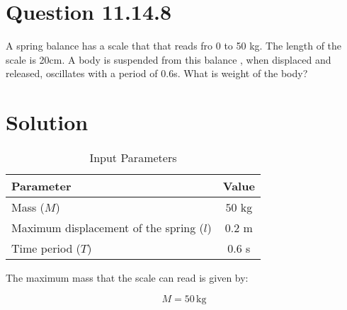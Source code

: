\documentclass[journal,12pt,twocolumn]{IEEEtran}
\theoremstyle{remark}
\begin{document}
\section{Question 11.14.8}A spring balance has a scale that that reads fro 0 to 50 kg. The length of the scale is 20cm. A body is suspended from this balance , when displaced and released, oscillates with a period of 0.6s. What is weight of the body? 

\section{Solution}

\begin{table}[htbp]                                       \centering                                              \caption{Input Parameters}
  \label{tab:parameters}                                  \begin{tabular}{lc}                                       \toprule                                                \textbf{Parameter} & \textbf{Value} \\                  \midrule                                                Mass ($M$) & $50$ kg \\ 
  Maximum displacement of the spring ($l$) & $0.2$ m \\ 
  Time period ($T$) & $0.6$ s \\                              \bottomrule                                           \end{tabular}                                         \end{table}


The maximum mass that the scale can read is given by:

	\begin{equation}
	M = 50 \, \text{kg}
	\end{equation}
	
	\begin{figure}[htbp]
		\centering
	\end{figure}
\end{document}
